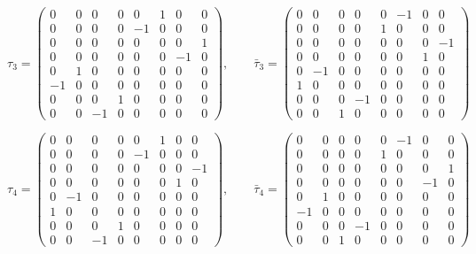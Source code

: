 \documentclass[
  10pt,
]{article}
\begin{document}
\[
\tau_3 = \begin{pmatrix} 0 & 0 & 0 & 0 & 0 & 1 & 0 & 0 \\ 0 & 0 & 0 & 0 & -1 & 0 & 0 & 0 \\ 0 & 0 & 0 & 0 & 0 & 0 & 0 & 1 \\ 0 & 0 & 0 & 0 & 0 & 0 & -1 & 0 \\ 0 & 1 & 0 & 0 & 0 & 0 & 0 & 0 \\ -1 & 0 & 0 & 0 & 0 & 0 & 0 & 0 \\ 0 & 0 & 0 & 1 & 0 & 0 & 0 & 0 \\ 0 & 0 & -1 & 0 & 0 & 0 & 0 & 0 \end{pmatrix},\qquad \bar\tau_3 = \begin{pmatrix} 0 & 0 & 0 & 0 & 0 & -1 & 0 & 0 \\ 0 & 0 & 0 & 0 & 1 & 0 & 0 & 0 \\ 0 & 0 & 0 & 0 & 0 & 0 & 0 & -1 \\ 0 & 0 & 0 & 0 & 0 & 0 & 1 & 0 \\ 0 & -1 & 0 & 0 & 0 & 0 & 0 & 0 \\ 1 & 0 & 0 & 0 & 0 & 0 & 0 & 0 \\ 0 & 0 & 0 & -1 & 0 & 0 & 0 & 0 \\ 0 & 0 & 1 & 0 & 0 & 0 & 0 & 0 \end{pmatrix}
\]

\[
\tau_4 = \begin{pmatrix} 0 & 0 & 0 & 0 & 0 & 1 & 0 & 0 \\ 0 & 0 & 0 & 0 & -1 & 0 & 0 & 0 \\ 0 & 0 & 0 & 0 & 0 & 0 & 0 & -1 \\ 0 & 0 & 0 & 0 & 0 & 0 & 1 & 0 \\ 0 & -1 & 0 & 0 & 0 & 0 & 0 & 0 \\ 1 & 0 & 0 & 0 & 0 & 0 & 0 & 0 \\ 0 & 0 & 0 & 1 & 0 & 0 & 0 & 0 \\ 0 & 0 & -1 & 0 & 0 & 0 & 0 & 0 \end{pmatrix},\qquad \bar\tau_4 = \begin{pmatrix} 0 & 0 & 0 & 0 & 0 & -1 & 0 & 0 \\ 0 & 0 & 0 & 0 & 1 & 0 & 0 & 0 \\ 0 & 0 & 0 & 0 & 0 & 0 & 0 & 1 \\ 0 & 0 & 0 & 0 & 0 & 0 & -1 & 0 \\ 0 & 1 & 0 & 0 & 0 & 0 & 0 & 0 \\ -1 & 0 & 0 & 0 & 0 & 0 & 0 & 0 \\ 0 & 0 & 0 & -1 & 0 & 0 & 0 & 0 \\ 0 & 0 & 1 & 0 & 0 & 0 & 0 & 0 \end{pmatrix}
\]
\end{document}
